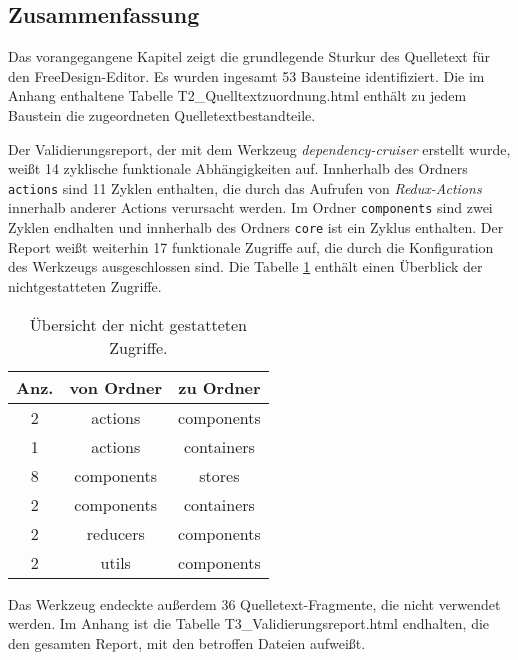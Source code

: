 \subsection{Zusammenfassung}
Das vorangegangene Kapitel zeigt die grundlegende Sturkur des Quelletext für den FreeDesign-Editor. 
Es wurden ingesamt 53 Bausteine identifiziert. Die im Anhang enthaltene Tabelle T2\_Quelltextzuordnung.html enthält zu jedem Baustein die zugeordneten Quelletextbestandteile.  

Der Validierungsreport, der mit dem Werkzeug \emph{dependency-cruiser} erstellt wurde, weißt 14 zyklische funktionale Abhängigkeiten auf.
Innherhalb des Ordners \lstinline|actions| sind 11 Zyklen enthalten, die durch das Aufrufen von \emph{Redux-Actions} innerhalb anderer Actions verursacht werden. 
Im Ordner \lstinline|components| sind zwei Zyklen endhalten und innherhalb des Ordners \lstinline|core| ist ein Zyklus enthalten.
Der Report weißt weiterhin 17 funktionale Zugriffe auf, die durch die Konfiguration des Werkzeugs ausgeschlossen sind. 
Die Tabelle \ref{table:not_allowed} enthält einen Überblick der nichtgestatteten Zugriffe.

\begin{table}[H]
    \centering
    \caption{Übersicht der nicht gestatteten Zugriffe.}
    \begin{tabular}{c|c|c}        
        \label{table:not_allowed}
        Anz. & von Ordner & zu Ordner \\
        \hline
        2 & actions & components \\
        1 & actions & containers \\
        8 & components & stores \\
        2 & components & containers \\
        2 & reducers & components \\
        2 & utils & components \\
    \end{tabular}
\end{table}    
 
Das Werkzeug endeckte außerdem 36 Quelletext-Fragmente, die nicht verwendet werden. 
Im Anhang ist die Tabelle T3\_Validierungsreport.html endhalten, die den gesamten Report, mit den betroffen Dateien aufweißt. 



